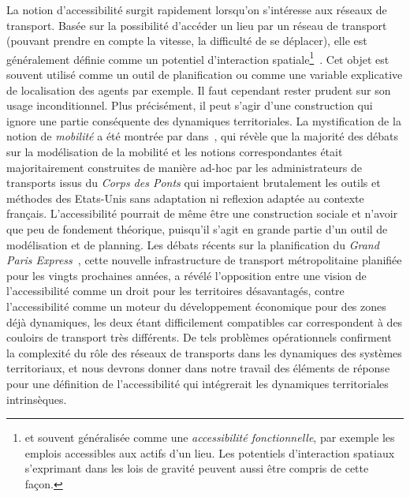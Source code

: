 {}{
La notion d'accessibilité surgit rapidement lorsqu'on s'intéresse aux réseaux de transport. Basée sur la possibilité d'accéder un lieu par un réseau de transport (pouvant prendre en compte la vitesse, la difficulté de se déplacer), elle est généralement définie comme un potentiel d'interaction spatiale\footnote{et souvent généralisée comme une \emph{accessibilité fonctionnelle}, par exemple les emplois accessibles aux actifs d'un lieu. Les potentiels d'interaction spatiaux s'exprimant dans les lois de gravité peuvent aussi être compris de cette façon.}~\cite{bavoux2005geographie}. Cet objet est souvent utilisé comme un outil de planification ou comme une variable explicative de localisation des agents par exemple.   Il faut cependant rester prudent sur son usage inconditionnel. Plus précisément, il peut s'agir d'une construction qui ignore une partie conséquente des dynamiques territoriales. La mystification   
 de la notion de \emph{mobilité} a été montrée par  dans~\cite{commenges:tel-00923682}, qui révèle que la majorité des débats sur la modélisation de la mobilité et les notions correspondantes était majoritairement construites de manière ad-hoc par les administrateurs de transports issus du \emph{Corps des Ponts}  
  qui importaient brutalement les outils et méthodes des Etats-Unis sans adaptation ni reflexion adaptée au contexte français. L'accessibilité pourrait de même être une construction sociale et n'avoir que peu de fondement théorique, puisqu'il s'agit en grande partie d'un outil de modélisation et de planning. Les débats récents sur la planification du \emph{Grand Paris Express}~\cite{confMangin}, 
   cette nouvelle infrastructure de transport métropolitaine planifiée pour les vingts prochaines années, a révélé l'opposition entre une vision de l'accessibilité comme un droit pour les territoires désavantagés, contre l'accessibilité comme un moteur du développement économique pour des zones déjà dynamiques, les deux étant difficilement compatibles car correspondent à des couloirs de transport très différents. De tels problèmes opérationnels confirment la complexité du rôle des réseaux de transports dans les dynamiques des systèmes territoriaux, et nous devrons donner dans notre travail des éléments de réponse pour une définition de l'accessibilité qui intégrerait les dynamiques territoriales intrinsèques.
}


